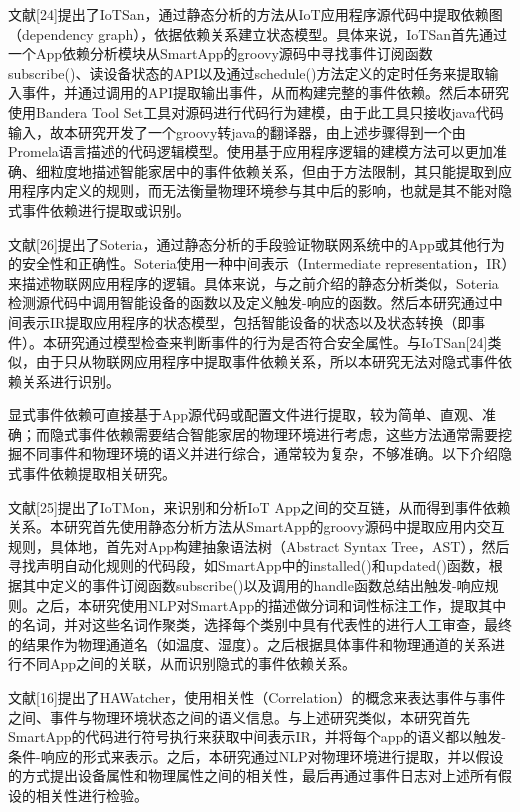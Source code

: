文献[24]提出了IoTSan，通过静态分析的方法从IoT应用程序源代码中提取依赖图（dependency graph），依据依赖关系建立状态模型。具体来说，IoTSan首先通过一个App依赖分析模块从SmartApp的groovy源码中寻找事件订阅函数subscribe()、读设备状态的API以及通过schedule()方法定义的定时任务来提取输入事件，并通过调用的API提取输出事件，从而构建完整的事件依赖。然后本研究使用Bandera Tool Set工具对源码进行代码行为建模，由于此工具只接收java代码输入，故本研究开发了一个groovy转java的翻译器，由上述步骤得到一个由Promela语言描述的代码逻辑模型。使用基于应用程序逻辑的建模方法可以更加准确、细粒度地描述智能家居中的事件依赖关系，但由于方法限制，其只能提取到应用程序内定义的规则，而无法衡量物理环境参与其中后的影响，也就是其不能对隐式事件依赖进行提取或识别。

文献[26]提出了Soteria，通过静态分析的手段验证物联网系统中的App或其他行为的安全性和正确性。Soteria使用一种中间表示（Intermediate representation，IR）来描述物联网应用程序的逻辑。具体来说，与之前介绍的静态分析类似，Soteria检测源代码中调用智能设备的函数以及定义触发-响应的函数。然后本研究通过中间表示IR提取应用程序的状态模型，包括智能设备的状态以及状态转换（即事件）。本研究通过模型检查来判断事件的行为是否符合安全属性。与IoTSan[24]类似，由于只从物联网应用程序中提取事件依赖关系，所以本研究无法对隐式事件依赖关系进行识别。

显式事件依赖可直接基于App源代码或配置文件进行提取，较为简单、直观、准确；而隐式事件依赖需要结合智能家居的物理环境进行考虑，这些方法通常需要挖掘不同事件和物理环境的语义并进行综合，通常较为复杂，不够准确。以下介绍隐式事件依赖提取相关研究。

文献[25]提出了IoTMon，来识别和分析IoT App之间的交互链，从而得到事件依赖关系。本研究首先使用静态分析方法从SmartApp的groovy源码中提取应用内交互规则，具体地，首先对App构建抽象语法树（Abstract Syntax Tree，AST），然后寻找声明自动化规则的代码段，如SmartApp中的installed()和updated()函数，根据其中定义的事件订阅函数subscribe()以及调用的handle函数总结出触发-响应规则。之后，本研究使用NLP对SmartApp的描述做分词和词性标注工作，提取其中的名词，并对这些名词作聚类，选择每个类别中具有代表性的进行人工审查，最终的结果作为物理通道名（如温度、湿度）。之后根据具体事件和物理通道的关系进行不同App之间的关联，从而识别隐式的事件依赖关系。

文献[16]提出了HAWatcher，使用相关性（Correlation）的概念来表达事件与事件之间、事件与物理环境状态之间的语义信息。与上述研究类似，本研究首先SmartApp的代码进行符号执行来获取中间表示IR，并将每个app的语义都以触发-条件-响应的形式来表示。之后，本研究通过NLP对物理环境进行提取，并以假设的方式提出设备属性和物理属性之间的相关性，最后再通过事件日志对上述所有假设的相关性进行检验。

